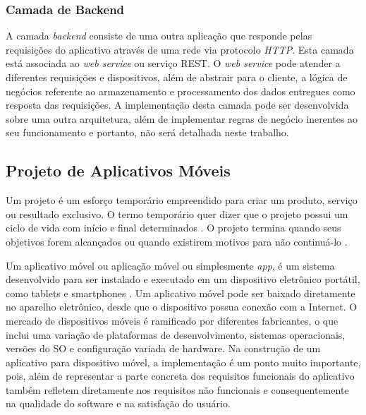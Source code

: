 \subsubsection{Camada de Backend}
A camada \textit{backend} consiste de uma outra aplicação que responde pelas requisições do aplicativo através de uma rede via protocolo \textit{HTTP}. Esta camada está associada ao \textit{web service} ou serviço REST. O \textit{web service} pode atender a diferentes requisições e dispositivos, além de abstrair para o cliente, a lógica de negócios referente ao armazenamento e processamento dos dados entregues como resposta das requisições. A implementação desta camada pode ser desenvolvida sobre uma outra arquitetura, além de implementar regras de negócio inerentes ao seu funcionamento e portanto, não será detalhada neste trabalho.


\subsection{Projeto de Aplicativos Móveis}
Um projeto é um esforço temporário empreendido para criar um produto, serviço ou resultado exclusivo. O termo temporário quer dizer que o projeto possui um ciclo de vida com início e final determinados \cite{governanadetidotcom}. O projeto termina quando seus objetivos forem alcançados ou quando existirem motivos para não continuá-lo \cite{governanadetidotcom}.\par

Um aplicativo móvel ou aplicação móvel ou simplesmente \textit{app}, é um sistema desenvolvido para ser instalado e executado em um dispositivo eletrônico portátil, como tablets e smartphones \cite{what_is_mobile}. Um aplicativo móvel pode ser baixado diretamente no aparelho eletrônico, desde que o dispositivo possua conexão com a Internet. O mercado de dispositivos móveis é ramificado por diferentes fabricantes, o que inclui uma variação de plataformas de desenvolvimento, sistemas operacionais, versões do SO e configuração variada de hardware. Na construção de um aplicativo para dispositivo móvel, a implementação é um ponto muito importante, pois, além de representar a parte concreta dos requisitos funcionais do aplicativo também refletem diretamente nos requisitos não funcionais e consequentemente na qualidade do software e na satisfação do usuário.\par


